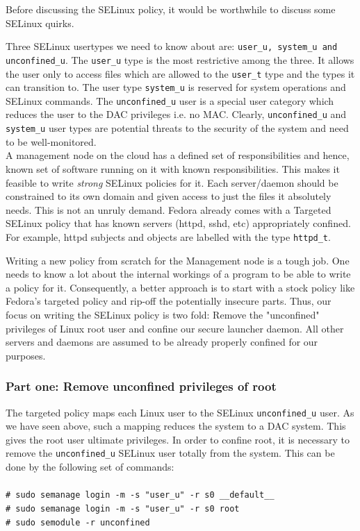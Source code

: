 \documentclass[10pt,twocolumn,pdftex]{article}
\begin{document}
Before discussing the SELinux policy, it would be worthwhile to discuss some SELinux quirks.

Three SELinux usertypes we need to know about are: {\tt user\_u, system\_u and unconfined\_u}. The {\tt user\_u} type is the most restrictive among the three. It allows the user only to access files which are allowed to the {\tt user\_t} type and the types it can transition to. The user type {\tt system\_u} is reserved for system operations and SELinux commands. The {\tt unconfined\_u} user is a special user category which reduces the user to the DAC privileges i.e. no MAC. Clearly, {\tt unconfined\_u} and {\tt system\_u} user types are potential threats to the security of the system and need to be well-monitored.\\

A management node on the cloud has a defined set of responsibilities and hence, known set of software running on it with known responsibilities. This makes it feasible to write \emph{strong} SELinux policies for it. Each server/daemon should be constrained to its own domain and given access to just the files it absolutely needs. This is not an unruly demand. Fedora already comes with a Targeted SELinux policy that has known servers (httpd, sshd, etc) appropriately confined. For example, httpd subjects and objects are labelled with the type {\tt httpd\_t}. 

Writing a new policy from scratch for the Management node is a tough job. One needs to know a lot about the internal workings of a program to be able to write a policy for it. Consequently, a better approach is to start with a stock policy like Fedora's targeted policy and rip-off the potentially insecure parts. Thus, our focus on writing the SELinux policy is two fold: Remove the "unconfined" privileges of Linux root user and confine our secure launcher daemon. All other servers and daemons are assumed to be already properly confined for our purposes.

\subsubsection{Part one: Remove unconfined privileges of root}
The targeted policy maps each Linux user to the SELinux {\tt unconfined\_u} user. As we have seen above, such a mapping reduces the system to a DAC system. This gives the root user ultimate privileges. In order to confine root, it is necessary to remove the {\tt unconfined\_u} SELinux user totally from the system. This can be done by the following set of commands:\\ \\
{\tt \# sudo semanage login -m -s "user\_u" -r s0 \_\_default\_\_}\\
{\tt \# sudo semanage login -m -s "user\_u" -r s0 root} \\
{\tt \# sudo semodule -r unconfined}\\
\end{document}
